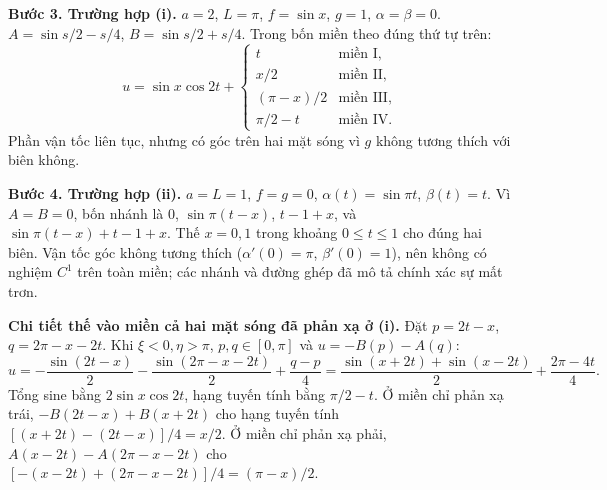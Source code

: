 \textbf{Bước 3. Trường hợp (i).} $a=2$, $L=\pi$, $f=\sin x$, $g=1$, $\alpha=\beta=0$. $A=\sin s/2-s/4$, $B=\sin s/2+s/4$. Trong bốn miền theo đúng thứ tự trên:
\[u=\sin x\cos2t+\begin{cases}t&\text{miền I},\\x/2&\text{miền II},\\(\pi-x)/2&\text{miền III},\\\pi/2-t&\text{miền IV}.\end{cases}\]
Phần vận tốc liên tục, nhưng có góc trên hai mặt sóng vì $g$ không tương thích với biên không.

\textbf{Bước 4. Trường hợp (ii).} $a=L=1$, $f=g=0$, $\alpha(t)=\sin\pi t$, $\beta(t)=t$. Vì $A=B=0$, bốn nhánh là $0$, $\sin\pi(t-x)$, $t-1+x$, và $\sin\pi(t-x)+t-1+x$. Thế $x=0,1$ trong khoảng $0\le t\le1$ cho đúng hai biên. Vận tốc góc không tương thích ($\alpha'(0)=\pi$, $\beta'(0)=1$), nên không có nghiệm $C^1$ trên toàn miền; các nhánh và đường ghép đã mô tả chính xác sự mất trơn.

\textbf{Chi tiết thế vào miền cả hai mặt sóng đã phản xạ ở (i).} Đặt $p=2t-x$, $q=2\pi-x-2t$. Khi $\xi<0,\eta>\pi$, $p,q\in[0,\pi]$ và $u=-B(p)-A(q)$:
\[u=-\frac{\sin(2t-x)}2-\frac{\sin(2\pi-x-2t)}2+\frac{q-p}{4}
=\frac{\sin(x+2t)+\sin(x-2t)}2+\frac{2\pi-4t}{4}.\]
Tổng sine bằng $2\sin x\cos2t$, hạng tuyến tính bằng $\pi/2-t$. Ở miền chỉ phản xạ trái, $-B(2t-x)+B(x+2t)$ cho hạng tuyến tính $[(x+2t)-(2t-x)]/4=x/2$. Ở miền chỉ phản xạ phải, $A(x-2t)-A(2\pi-x-2t)$ cho $[-(x-2t)+(2\pi-x-2t)]/4=(\pi-x)/2$.
